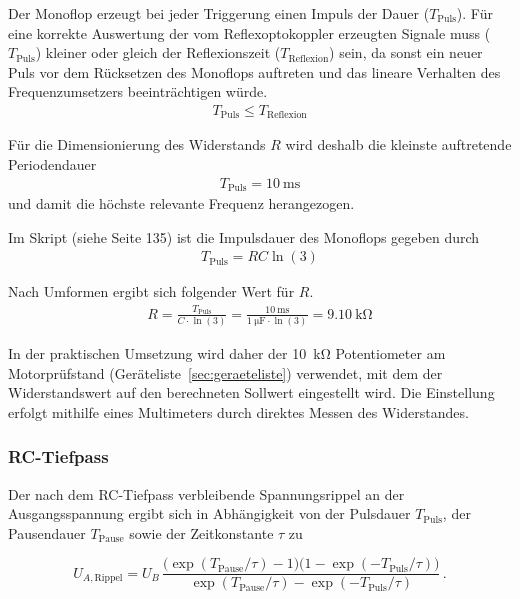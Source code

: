 Der Monoflop erzeugt bei jeder Triggerung einen Impuls der Dauer ($T_{\text{Puls}}$). Für eine korrekte Auswertung der vom Reflexoptokoppler erzeugten Signale muss ($T_{\text{Puls}}$) kleiner oder gleich der Reflexionszeit ($T_{\text{Reflexion}}$) sein, da sonst ein neuer Puls vor dem Rücksetzen des Monoflops auftreten und das lineare Verhalten des Frequenzumsetzers beeinträchtigen würde.
\begin{gather}
	T_{\text{Puls}} \leq T_{\text{Reflexion}}  \label{eq:40_t_puls_condition}
\end{gather}

Für die Dimensionierung des Widerstands $R$ wird deshalb die kleinste auftretende Periodendauer
\begin{gather}
	T_{\text{Puls}} = \SI{10}{\milli\second}
\end{gather}
und damit die höchste relevante Frequenz herangezogen.

Im Skript (siehe Seite 135) ist die Impulsdauer des Monoflops gegeben durch
\begin{gather}
	T_{\text{Puls}} = R C \ln(3) \label{eq:40_t_puls}
\end{gather}

Nach Umformen ergibt sich folgender Wert für $R$.
\begin{gather}
	R = \frac{T_{\text{Puls}}}{C\cdot\ln(3)} = \frac{\SI{10}{\milli\second}}{\SI{1}{\micro\farad}\cdot \ln(3)} = \SI{9.10}{\kilo\ohm}
\end{gather}

In der praktischen Umsetzung wird daher der \SI{10}{\kilo\ohm} Potentiometer am Motorprüfstand (Geräteliste~\ref{sec:geraeteliste}) verwendet, mit dem der Widerstandswert auf den berechneten Sollwert eingestellt wird. Die Einstellung erfolgt mithilfe eines Multimeters durch direktes Messen des Widerstandes.

\subsubsection{RC-Tiefpass}\label{sec:40_rc_tiefpass}
Der nach dem RC-Tiefpass verbleibende Spannungsrippel an der Ausgangsspannung ergibt sich in Abhängigkeit von der Pulsdauer \(T_\mathrm{Puls}\), der Pausendauer \(T_\mathrm{Pause}\) sowie der Zeitkonstante \(\tau\) zu

\begin{equation}
	U_{A,\mathrm{Rippel}}
	= U_B \,
	\frac{\bigl(\exp(T_\mathrm{Pause}/\tau)-1\bigr)
		\bigl(1-\exp(-T_\mathrm{Puls}/\tau)\bigr)}
	{\exp(T_\mathrm{Pause}/\tau)-\exp(-T_\mathrm{Puls}/\tau)} \, .
\end{equation}

